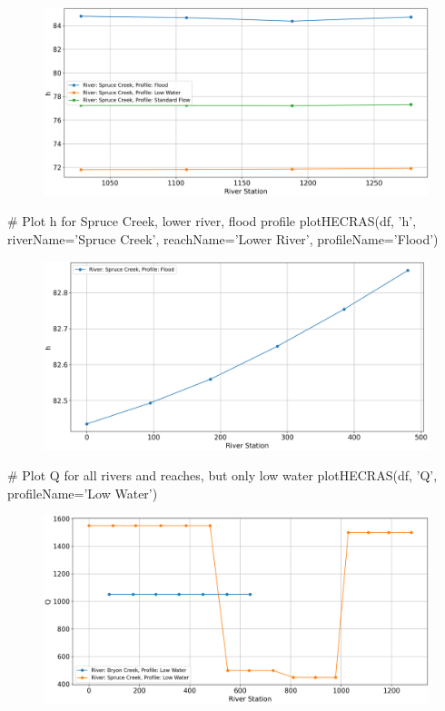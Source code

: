 \documentclass{article}
\begin{document}
\begin{figure}[h]
    \centering
    \includegraphics[width=\textwidth]{upperRiver_h.png}
\end{figure}

\begin{python}
# Plot h for Spruce Creek, lower river, flood profile
plotHECRAS(df, 'h', riverName='Spruce Creek', 
                    reachName='Lower River', 
                    profileName='Flood')
\end{python}

\begin{figure}[h]
    \centering
    \includegraphics[width=\textwidth]{lowRiverFlood.png}
\end{figure}

\newpage

\begin{python}
# Plot Q for all rivers and reaches, but only low water
plotHECRAS(df, 'Q', profileName='Low Water')
\end{python}

\begin{figure}[h]
    \centering
    \includegraphics[width=\textwidth]{q_lowWater.png}
\end{figure}
\end{document}

